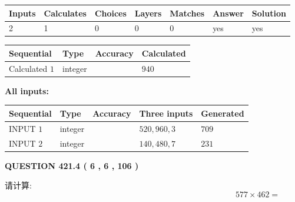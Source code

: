 \documentclass{ctexart}
\begin{document}
   
   
   
\noindent\begin{tabular}{|l|l|l|l|l|l|l|}
 \hline
Inputs & Calculates & Choices & Layers & Matches & Answer & Solution \\ \hline
 2  & 
 1  & 
 0
  & 
 0  & 
 0  & 
  yes & 
  yes 
  \\ \hline
 \end{tabular}
   
   
   
   
\noindent{}
   
   
  
  
\noindent\begin{tabular}{|l|l|l|l|}
\hline
 Sequential & Type & Accuracy & Calculated \\ 
\hline
 
 
  Calculated $  1 $ & integer &  & 
  $ 940 $ 
 \\  \hline  
 \end{tabular}
   
   
   
   
\noindent\vspace{0.1in}\hspace{-0.08in} {\textbf{\Large{All inputs: }}}
   
   
  
  
\noindent\begin{tabular}{|l|l|l|l|l|}
\hline
 Sequential & Type & Accuracy & Three inputs & Generated \\ 
\hline
 
 
  INPUT $  1 $ & integer &  & $
 520
 , 
 960
 , 
 3
 $ & $ 709 $ 
 \\  \hline  
 
 
  INPUT $  2 $ & integer &  & $
 140
 , 
 480
 , 
 7
 $ & $ 231 $ 
 \\  \hline  
 \end{tabular}
   
   
  
\vspace{0.2in}
  
{\textbf{\Large{QUESTION
421.4 
 ( 6 , 6 , 106 )
}}}
  
  
 
请计算:
\begin{equation}
577  \times    %
462 = \nonumber
\end{equation}
 
 
 
\end{document}
